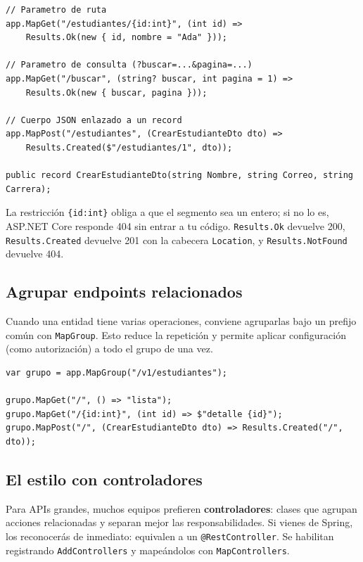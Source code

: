 \documentclass[11pt]{article}
\begin{document}
\begin{cajacodigo}
\begin{lstlisting}[style=cs]
// Parametro de ruta
app.MapGet("/estudiantes/{id:int}", (int id) =>
    Results.Ok(new { id, nombre = "Ada" }));

// Parametro de consulta (?buscar=...&pagina=...)
app.MapGet("/buscar", (string? buscar, int pagina = 1) =>
    Results.Ok(new { buscar, pagina }));

// Cuerpo JSON enlazado a un record
app.MapPost("/estudiantes", (CrearEstudianteDto dto) =>
    Results.Created($"/estudiantes/1", dto));

public record CrearEstudianteDto(string Nombre, string Correo, string Carrera);
\end{lstlisting}
\end{cajacodigo}
\vspace{2pt}
La restricción \texttt{\{id:int\}} obliga a que el segmento sea un entero; si no lo es, ASP.NET Core responde 404 sin entrar a tu código. \texttt{Results.Ok} devuelve 200, \texttt{Results.Created} devuelve 201 con la cabecera \texttt{Location}, y \texttt{Results.NotFound} devuelve 404.

\subsection{Agrupar endpoints relacionados}
Cuando una entidad tiene varias operaciones, conviene agruparlas bajo un prefijo común con \texttt{MapGroup}. Esto reduce la repetición y permite aplicar configuración (como autorización) a todo el grupo de una vez.

\begin{cajacodigo}
\begin{lstlisting}[style=cs]
var grupo = app.MapGroup("/v1/estudiantes");

grupo.MapGet("/", () => "lista");
grupo.MapGet("/{id:int}", (int id) => $"detalle {id}");
grupo.MapPost("/", (CrearEstudianteDto dto) => Results.Created("/", dto));
\end{lstlisting}
\end{cajacodigo}

\subsection{El estilo con controladores}
Para APIs grandes, muchos equipos prefieren \textbf{controladores}: clases que agrupan acciones relacionadas y separan mejor las responsabilidades. Si vienes de Spring, los reconocerás de inmediato: equivalen a un \texttt{@RestController}. Se habilitan registrando \texttt{AddControllers} y mapeándolos con \texttt{MapControllers}.
\end{document}
